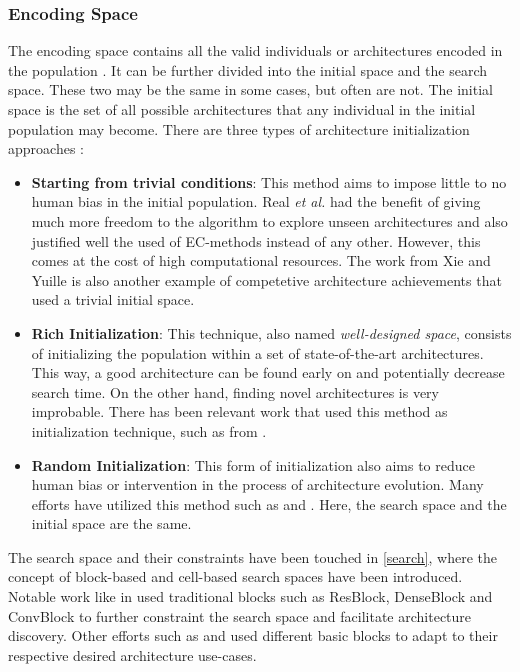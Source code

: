 \documentclass[10pt,        %
               a4paper,     %
               journal,     %
               ]{IEEEtran}
\begin{document}
\subsubsection{Encoding Space}
The encoding space contains all the valid individuals or architectures encoded in the population \cite{liu2021survey}.
It can be further divided into the initial space and the search space. These two may be the same in some cases,
but often are not. The initial space is the set of all possible architectures that any individual in the initial population may
become. There are three types of architecture initialization approaches \cite{liu2021survey}:

\begin{itemize}
    \item \textbf{Starting from trivial conditions}: This method aims to impose little to no human bias in the initial
     population. Real \textit{et al.} \cite{pmlr-v70-real17a} had the benefit of giving much more freedom to the algorithm
     to explore unseen architectures and also justified well the used of EC-methods instead of any other.
     However, this comes at the cost of high computational resources. The work from Xie and Yuille \cite{xie2017genetic} is
     also another example of competetive architecture achievements that used a trivial initial space.

    \item \textbf{Rich Initialization}: This technique, also named \textit{well-designed space}, consists of initializing
    the population within a set of state-of-the-art architectures. This way, a good architecture can be found early on
    and potentially decrease search time. On the other hand, finding novel architectures is very improbable. There has been
    relevant work that used this method as initialization technique, such as from \cite{fujino2017deep}.

    \item \textbf{Random Initialization}: This form of initialization also aims to reduce human bias or intervention in
     the process of architecture evolution. Many efforts have utilized this method such as \cite{sun2019evolving} and
     \cite{sun2019completely}. Here, the search space and the initial space are the same.
\end{itemize}

The search space and their constraints have been touched in \ref{search}, where the concept of block-based and cell-based
search spaces have been introduced. Notable work like in \cite{sun2019completely} used traditional blocks such as ResBlock, DenseBlock
and ConvBlock to further constraint the search space and facilitate architecture discovery. Other efforts such as
\cite{chen2019auto} and \cite{song2020efficient} used different basic blocks to adapt to their respective desired architecture
use-cases.
\end{document}
